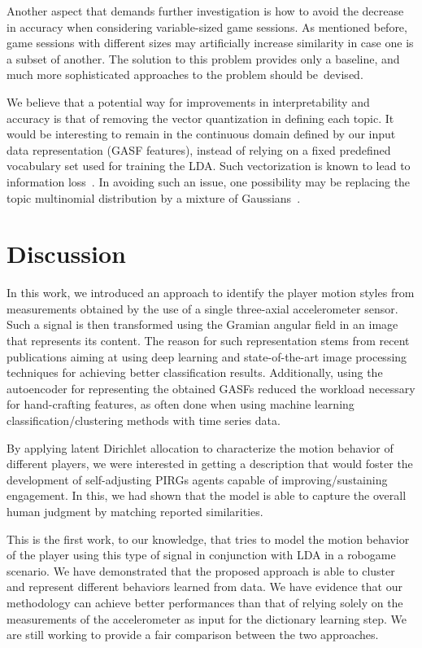 {Another aspect that demands further investigation is how to avoid the decrease in accuracy when considering variable-sized game sessions. As mentioned before, game sessions with different sizes may artificially increase similarity in case one is a subset of another. The solution to this problem provides only a baseline, and much more sophisticated approaches to the problem should be~devised.

We believe that a potential way for improvements in interpretability and accuracy is that of removing the vector quantization in defining each topic. It would be interesting to remain in the continuous domain defined by our input data representation (GASF features), instead of relying on a fixed predefined vocabulary set used for training the LDA. Such vectorization is known to lead to information loss~\cite{hu_latent_2012}. In avoiding such an issue, one possibility may be replacing the topic multinomial distribution by a mixture of Gaussians~\cite{hu_latent_2012}.

\section{Discussion}
In this work, we introduced an approach to identify the player motion styles from measurements obtained by the use of a single three-axial accelerometer sensor. Such a signal is then transformed using the Gramian angular field in an image that represents its content. The reason for such representation stems from recent publications aiming at using deep learning and state-of-the-art image processing techniques for achieving better classification results. Additionally, using the autoencoder for representing the obtained GASFs reduced the workload necessary for hand-crafting features, as often done when using machine learning classification/clustering methods with time series data.

By applying latent Dirichlet allocation to characterize the motion behavior of different players, we were interested in getting a description that would foster the development of self-adjusting PIRGs agents capable of improving/sustaining engagement. In this, we had shown that the model is able to capture the overall human judgment by matching reported similarities. 

This is the first work, to our knowledge, that tries to model the motion behavior of the player using this type of signal in conjunction with LDA in a robogame scenario. We have demonstrated that the proposed approach is able to cluster and represent different behaviors learned from data. We have evidence that our methodology can achieve better performances than that of relying solely on the measurements of the accelerometer as input for the dictionary learning step. We are still working to provide a fair comparison between the two approaches.

}
